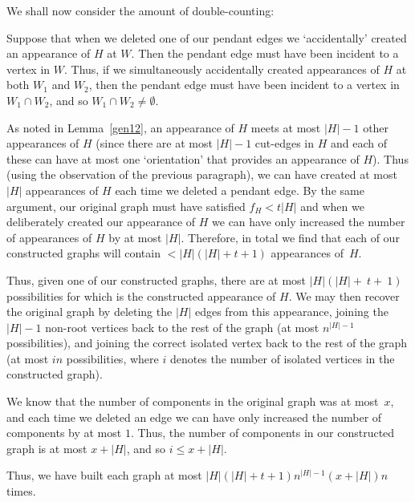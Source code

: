 \documentclass{article}
\newtheorem{Proof of Theorem}{Proof of Theorem}
\begin{document}
We shall now consider the amount of double-counting:

Suppose that when we deleted one of our pendant edges 
we `accidentally' created an appearance of $H$ at $W$.
Then the pendant edge must have been incident to a vertex in $W$.
Thus, if we simultaneously accidentally created appearances of $H$ at both $W_{1}$ and $W_{2}$,
then the pendant edge must have been incident to a vertex in $W_{1} \cap W_{2}$,
and so $W_{1} \cap W_{2} \neq \emptyset$.

As noted in Lemma~\ref{gen12},
an appearance of $H$ meets at most $|H|-1$ other appearances of $H$
(since there are at most $|H|-1$ cut-edges in $H$
and each of these can have at most one `orientation' that provides an appearance of $H$).
Thus 
(using the observation of the previous paragraph),
we can have created at most $|H|$ appearances of $H$ each time we deleted a pendant edge.
By the same argument,
our original graph must have satisfied $f_{H} < t|H|$
and when we deliberately created our appearance of $H$
we can have only increased the number of appearances of $H$ by at most $|H|$.
Therefore, 
in total we find that each of our constructed graphs will contain $<|H|(|H|+t+1)$ appearances of~$H$.

Thus, given one of our constructed graphs,
there are at most $|H|(|H|+~\!t+~\!1)$
possibilities for which is the constructed appearance of $H$.
We may then recover the original graph by deleting the $|H|$ edges from this appearance,
joining the $|H|-1$ non-root vertices back to the rest of the graph
(at most $n^{|H|-1}$ possibilities),
and joining the correct isolated vertex back to the rest of the graph
(at most $in$ possibilities,
where $i$ denotes the number of isolated vertices in the constructed graph).

We know that the number of components in the original graph was at most~$x$,
and each time we deleted an edge we can have only increased the number of components by at most $1$.
Thus, the number of components in our constructed graph is at most $x+|H|$,
and so $i \leq x+|H|$.

Thus, we have built each graph at most
$|H|(|H|+t+1)n^{|H|-1}(x+|H|)n$ times. \\
\end{document}
